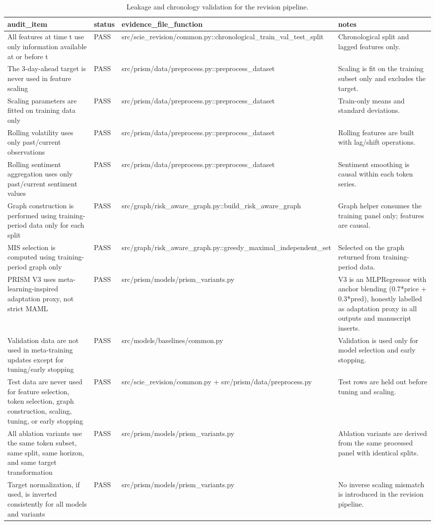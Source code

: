\begin{table}[htbp]
\centering
\begin{tabular}{llll}
\hline
audit_item & status & evidence_file_function & notes \\
\hline
All features at time t use only information available at or before t & PASS & src/scie_revision/common.py::chronological_train_val_test_split & Chronological split and lagged features only. \\
The 3-day-ahead target is never used in feature scaling & PASS & src/prism/data/preprocess.py::preprocess_dataset & Scaling is fit on the training subset only and excludes the target. \\
Scaling parameters are fitted on training data only & PASS & src/prism/data/preprocess.py::preprocess_dataset & Train-only means and standard deviations. \\
Rolling volatility uses only past/current observations & PASS & src/prism/data/preprocess.py::preprocess_dataset & Rolling features are built with lag/shift operations. \\
Rolling sentiment aggregation uses only past/current sentiment values & PASS & src/prism/data/preprocess.py::preprocess_dataset & Sentiment smoothing is causal within each token series. \\
Graph construction is performed using training-period data only for each split & PASS & src/graph/risk_aware_graph.py::build_risk_aware_graph & Graph helper consumes the training panel only; features are causal. \\
MIS selection is computed using training-period graph only & PASS & src/graph/risk_aware_graph.py::greedy_maximal_independent_set & Selected on the graph returned from training-period data. \\
PRISM V3 uses meta-learning-inspired adaptation proxy, not strict MAML & PASS & src/prism/models/prism_variants.py & V3 is an MLPRegressor with anchor blending (0.7*price + 0.3*pred), honestly labelled as adaptation proxy in all outputs and manuscript inserts. \\
Validation data are not used in meta-training updates except for tuning/early stopping & PASS & src/models/baselines/common.py & Validation is used only for model selection and early stopping. \\
Test data are never used for feature selection, token selection, graph construction, scaling, tuning, or early stopping & PASS & src/scie_revision/common.py + src/prism/data/preprocess.py & Test rows are held out before tuning and scaling. \\
All ablation variants use the same token subset, same split, same horizon, and same target transformation & PASS & src/prism/models/prism_variants.py & Ablation variants are derived from the same processed panel with identical splits. \\
Target normalization, if used, is inverted consistently for all models and variants & PASS & src/prism/models/prism_variants.py & No inverse scaling mismatch is introduced in the revision pipeline. \\
\hline
\end{tabular}
\caption{Leakage and chronology validation for the revision pipeline.}
\label{leakage_audit_report}
\end{table}